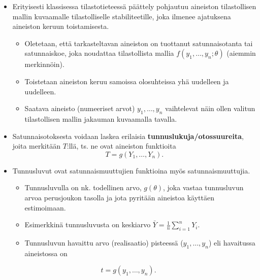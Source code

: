\documentclass[
]{book}
\providecommand{\tightlist}{%
  \setlength{\itemsep}{0pt}\setlength{\parskip}{0pt}}
\begin{document}
\begin{itemize}
\item
  Erityisesti klassisessa tilastotieteessä päättely pohjautuu aineiston tilastollisen mallin kuvaamalle tilastolliselle stabiliteetille, joka ilmenee ajatuksena aineiston keruun toistamisesta.

  \begin{itemize}
  \tightlist
  \item
    Oletetaan, että tarkasteltavan aineiston on tuottanut satunnaisotanta tai satunnaiskoe, joka noudattaa tilastollista mallia \(f(y_1, \ldots, y_n; \theta)\) (aiemmin merkinnöin).
  \item
    Toistetaan aineiston keruu samoissa olosuhteissa yhä uudelleen ja uudelleen.
  \item
    Saatava aineisto (numeeriset arvot) \(y_1, \ldots, y_n\) vaihtelevat näin ollen valitun tilastollisen mallin jakauman kuvaamalla tavalla.
  \end{itemize}
\item
  Satunnaisotoksesta voidaan laskea erilaisia \textbf{tunnuslukuja/otossuureita}, joita merkitään \(T\):llä, ts. ne ovat aineiston funktioita
  \[
  T = g(Y_1, \ldots, Y_n).
  \]
\item
  Tunnusluvut ovat satunnaismuuttujien funktioina myös satunnaismuuttujia.

  \begin{itemize}
  \tightlist
  \item
    Tunnusluvulla on nk. todellinen arvo, \(g(\theta)\), joka vastaa tunnusluvun arvoa perusjoukon tasolla ja jota pyritään aineistoa käyttäen estimoimaan.
  \item
    Esimerkkinä tunnusluvusta on keskiarvo \(\bar{Y} = \frac{1}{n} \sum_{i=1}^{n} Y_i\).
  \item
    Tunnusluvun havaittu arvo (realisaatio) pisteessä (\(y_1,\ldots, y_n\)) eli havaitussa aineistossa on
  \end{itemize}
\end{itemize}

\[
t = g(y_1, \ldots, y_n).
\]
\end{document}
